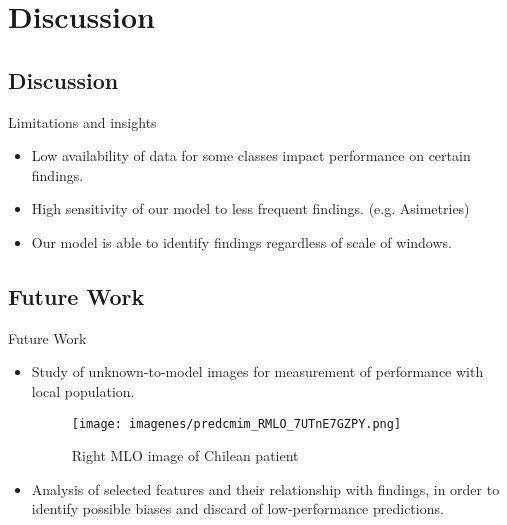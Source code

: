 \section{Discussion}
\subsection{Discussion}
\begin{frame}{Limitations and insights}
    \begin{itemize}
        \item Low availability of data for some classes impact performance on certain findings.
        \item High sensitivity of our model to less frequent findings. (e.g. Asimetries)
        \item Our model is able to identify findings regardless of scale of windows.
    \end{itemize}
\end{frame}


\subsection{Future Work}
\begin{frame}{Future Work}
    \begin{itemize}
        \item Study of unknown-to-model images for measurement of performance with local population.
        
        \begin{figure}
            \centering
            \texttt{[image: imagenes/predcmim\_RMLO\_7UTnE7GZPY.png]}
            \caption{Right MLO image of Chilean patient}
        \end{figure}

        \item Analysis of selected features and their relationship with findings, in order to identify possible biases and discard of low-performance predictions.
    \end{itemize}
\end{frame}
